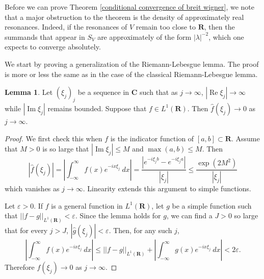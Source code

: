 \documentclass[12pt]{report}
\newcommand{\RR}{\mathbf{R}}
\newcommand{\CC}{\mathbf{C}}
\renewcommand{\Re}{\operatorname{Re}}
\renewcommand{\Im}{\operatorname{Im}}
\theoremstyle{definition}
\newtheorem{lemma}[theorem]{Lemma}
\begin{document}
Before we can prove Theorem \ref{conditional convergence of breit wigner}, we note that a major obstruction to the theorem is the density of approximately real resonances. Indeed, if the resonances of $V$ remain too close to $\RR$, then the summands that appear in $S_V$ are approximately of the form $|\lambda|^{-2}$, which one expects to converge absolutely.

We start by proving a generalization of the Riemann-Lebesgue lemma. The proof is more or less the same as in the case of the classical Riemann-Lebesgue lemma.
\begin{lemma}
\label{RiemannLebesgue}
Let $(\xi_j)_j$ be a sequence in $\CC$ such that as $j \to \infty$, $|\Re \xi_j| \to \infty$ while $|\Im \xi_j|$ remains bounded. Suppose that $f \in L^1(\RR)$. Then $\hat f(\xi_j) \to 0$ as $j \to \infty$.
\end{lemma}
\begin{proof}
We first check this when $f$ is the indicator function of $[a, b] \subset \RR$. Assume that $M > 0$ is so large that $|\Im \xi_j| \leq M$ and $\max(a, b) \leq M$. Then
$$|\hat f(\xi_j)| = \left|\int_{-\infty}^\infty f(x)e^{-ix\xi_j} ~dx\right| = \frac{|e^{-i\xi_jb} - e^{-i\xi_ja}|}{|\xi_j|} \leq \frac{\exp(2M^2)}{|\xi_j|}$$
which vanishes as $j \to \infty$. Linearity extends this argument to simple functions.

Let $\varepsilon > 0$. If $f$ is a general function in $L^1(\RR)$, let $g$ be a simple function such that $||f - g||_{L^1(\RR)} < \varepsilon$. Since the lemma holds for $g$, we can find a $J > 0$ so large that for every $j > J$, $|\hat g(\xi_j)| < \varepsilon$.
Then, for any such $j$,
$$\left|\int_{-\infty}^\infty f(x) e^{-ix\xi_j} ~dx\right| \leq ||f - g||_{L^1(\RR)} + \left|\int_{-\infty}^\infty g(x)e^{-ix\xi_j} ~dx\right| < 2\varepsilon.$$
Therefore $f(\xi_j) \to 0$ as $j \to \infty$.
\end{proof}
\end{document}
